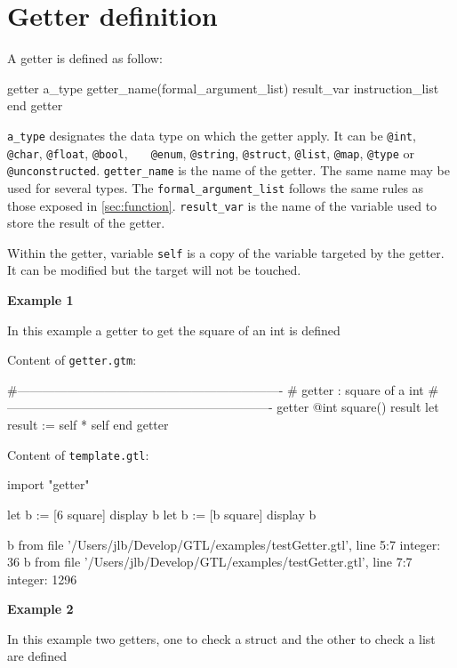 \documentclass[10pt,openright,twosides,final]{memoir}
\newcommand{\gtltype}[1]{{\small\ttfamily #1}}
\newcommand{\gtlinline}[1]{\colorbox{light-blue}{\lstinline[language=gtl]{#1}}}
\newcommand{\examplen}[1]{\vspace{.75em}\noindent\textbf{Example #1}\vspace{0em}}
\begin{document}
\section{Getter definition}
\label{sec:getter}

A getter is defined as follow:

\begin{gtl}
getter a_type getter_name(formal_argument_list) result_var
  instruction_list
end getter
\end{gtl}

\gtlinline{a_type} designates the data type on which the getter apply. It can be \gtlinline{@int},  \gtlinline{@char}, \gtlinline{@float}, \gtlinline{@bool}, \gtlinline{	@enum}, \gtlinline{@string}, \gtlinline{@struct}, \gtlinline{@list}, \gtlinline{@map}, \gtlinline{@type} or \gtlinline{@unconstructed}. \gtlinline{getter_name} is the name of the getter. The same name may be used for several types. The \gtlinline{formal_argument_list} follows the same rules as those exposed in \ref{sec:function}. \gtlinline{result_var} is the name of the variable used to store the result of the getter.

Within the getter, variable \gtlinline{self} is a copy of the variable targeted by the getter. It can be modified but the target will not be touched.

\examplen{1}

In this example a getter to get the square of an \gtltype{int} is defined

\noindent Content of \texttt{\footnotesize getter.gtm}:
\begin{gtl}
#----------------------------------------------------------------
# getter : square of a int
#----------------------------------------------------------------
getter @int square() result
  let result := self * self
end getter
\end{gtl}
\noindent Content of \texttt{\footnotesize template.gtl}:
\begin{gtl}
import "getter"

let b := [6 square]
display b
let b := [b square]
display b
\end{gtl}
\begin{console}
b from file '/Users/jlb/Develop/GTL/examples/testGetter.gtl', line 5:7
    integer: 36
b from file '/Users/jlb/Develop/GTL/examples/testGetter.gtl', line 7:7
    integer: 1296
\end{console}

\examplen{2}

In this example two getters, one to check a \gtltype{struct} and the other to check a \gtltype{list} are defined
\end{document}
